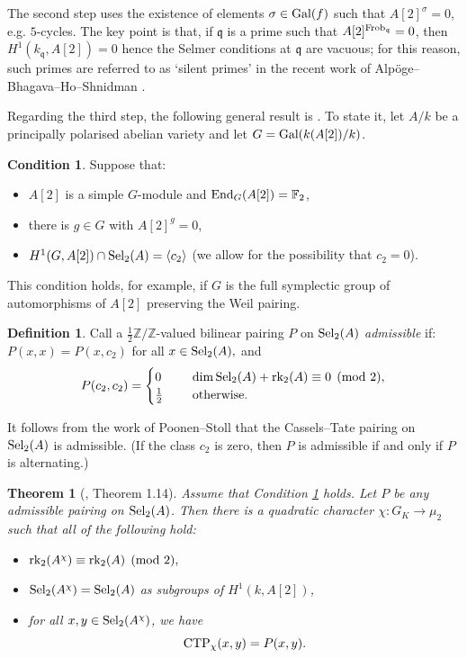 \documentclass[10pt]{amsart}
\numberwithin{equation}{section}
\newtheorem{theorem}[equation]{Theorem}
\theoremstyle{remark}
\theoremstyle{definition}
\theoremstyle{definition}
\theoremstyle{definition}
\newtheorem{defi}[equation]{Definition}
\theoremstyle{definition}
\theoremstyle{definition}
\theoremstyle{definition}
\theoremstyle{definition}
\newtheorem{condition}[equation]{Condition}
\theoremstyle{definition}
\begin{document}
The second step uses the existence of elements $\sigma \in \textup{Gal}(f)$ such that $A[2]^\sigma=0$, e.g. $5$-cycles. The key point is that, if $\mathfrak{q}$ is a prime such that $A[2]^{\textup{Frob}_\mathfrak{q}}=0$,  then $H^1(k_\mathfrak{q},A[2])=0$ hence the Selmer conditions at $\mathfrak{q}$ are vacuous; for this reason, such primes are referred to as `silent primes' in the recent work of Alpöge--Bhagava--Ho--Shnidman \cite{ABHS26}. 

Regarding the third step, the following general result is \cite[Theorem 1.14]{mor2025}. To state it, let $A/k$ be a principally polarised abelian variety and let $G=\textup{Gal}(k(A[2])/k)$. 
\begin{condition} \label{genericity_cond}
Suppose that:
\begin{itemize}
\item[(A)] $A[2]$ is a simple $G$-module and $\textup{End}_G(A[2])=\mathbb{F}_2$,
\item[(B)] there is $g\in G$ with $A[2]^g=0$,
\item[(C)] $H^1(G,A[2])\cap \textup{Sel}_2(A)=\left \langle c_2\right \rangle$ (we allow for the possibility that $c_2=0$).  
\end{itemize}
\end{condition}
This condition holds, for example, if $G$ is the full symplectic group of automorphisms of $A[2]$ preserving the Weil pairing. 


\begin{defi}
  Call a $\tfrac{1}{2}\mathbb{Z}/\mathbb{Z}$-valued bilinear pairing $P$ on $\textup{Sel}_2(A)$   \textit{admissible} if: $P(x,x)=P(x,c_2)$ for all $x\in \textup{Sel}_2(A),$  
and 
\[P(c_2,c_2)=\begin{cases}0~~&~~\dim \textup{Sel}_2(A)+\textup{rk}_2(A)\equiv 0 \pmod 2,\\ \tfrac{1}{2}~~&~~ \textup{otherwise.}\end{cases}  \]
\end{defi}



It follows from the work of Poonen--Stoll that the Cassels--Tate pairing on $\textup{Sel}_2(A)$ is admissible.    (If the class $c_2$ is zero, then $P$ is admissible if and only if $P$ is alternating.)

\begin{theorem}[\cite{mor2025}, Theorem 1.14] \label{key_cassels_tate_prop_4_sel_intro}
Assume that Condition \ref{genericity_cond} holds. Let $P$ be any admissible pairing on $\textup{Sel}_2(A)$. Then there is a quadratic character $\chi:G_K\rightarrow \mu_2$ such that all of the following hold:
\begin{itemize}
\item[(i)] $\textup{rk}_2(A^{\chi})\equiv \textup{rk}_2(A) \pmod 2,$
\item[(ii)] $\textup{Sel}_2(A^{\chi})=\textup{Sel}_2(A)$ as subgroups of $H^1(k,A[2])$,
\item[(iii)] for all $x,y\in \textup{Sel}_2(A^{\chi})$, we have 
\[\textup{CTP}_{\chi}(x,y)=P(x,y).\]
\end{itemize}
\end{theorem}
\end{document}
